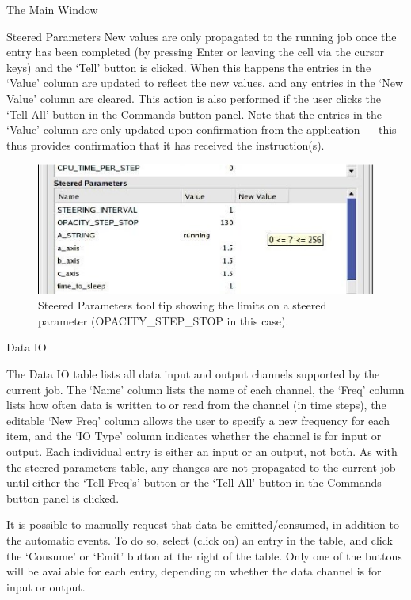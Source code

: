 \documentclass[a4paper,twoside]{article}
\begin{document}
\begin{section}{The Main Window}
\begin{subsection}{Steered Parameters}
New values are only propagated to the running job once the entry has
been completed (by pressing Enter or leaving the cell via the cursor
keys) and the `Tell' button is clicked. When this happens the entries
in the `Value' column are updated to reflect the new values, and any
entries in the `New Value' column are cleared. This action is also
performed if the user clicks the `Tell All' button in the Commands button
panel.  Note that the entries in the `Value' column are only updated
upon confirmation from the application --- this thus provides
confirmation that it has received the instruction(s).

\begin{figure}
\centerline{\includegraphics{limits_tool_tip.eps}}
\caption{Steered Parameters tool tip showing the limits on a steered 
parameter (OPACITY\_\-STEP\_\-STOP in this case).}
\label{fig:limits_tool_tip}
\end{figure}

\end{subsection} %


\begin{subsection}{Data IO}

The Data IO table lists all data input and output channels supported
by the current job. The `Name' column lists the name of each channel,
the `Freq' column lists how often data is written to or read from the
channel (in time steps), the editable `New Freq' column allows the
user to specify a new frequency for each item, and the `IO Type'
column indicates whether the channel is for input or output.  Each
individual entry is either an input or an output, not both. As with
the steered parameters table, any changes are not propagated to the
current job until either the `Tell Freq's' button or the `Tell All'
button in the Commands button panel is clicked.

It is possible to manually request that data be emitted/consumed, in
addition to the automatic events. To do so, select (click on) an entry
in the table, and click the `Consume' or `Emit' button at the right
of the table. Only one of the buttons will be available for each
entry, depending on whether the data channel is for input or output.


\end{subsection}
\end{section}
\end{document}
